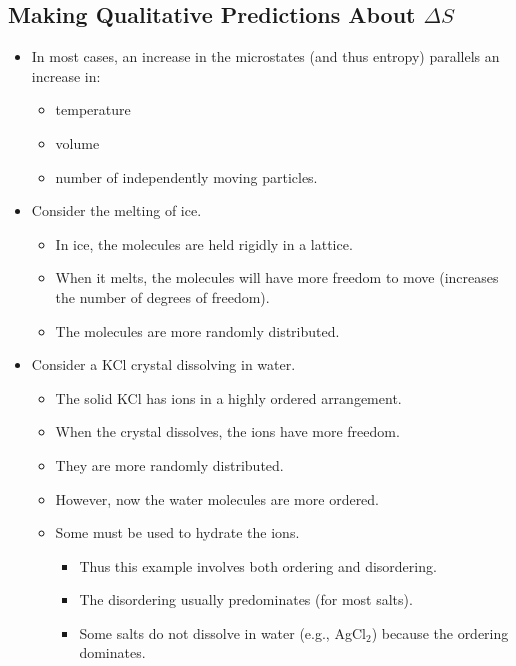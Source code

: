 \documentclass[10pt]{article}
\begin{document}
\subsection*{Making Qualitative Predictions About $\Delta S$}
\begin{itemize}
    \item In most cases, an increase in the microstates (and thus entropy) parallels an increase in:
    \begin{itemize}
        \item temperature
        \item volume
        \item number of independently moving particles.
    \end{itemize}
    \item Consider the melting of ice.
    \begin{itemize}
        \item In ice, the molecules are held rigidly in a lattice.
        \item When it melts, the molecules will have more freedom to move (increases the number of degrees of freedom).
        \item The molecules are more randomly distributed.
    \end{itemize}
    \item Consider a KCl crystal dissolving in water.
    \begin{itemize}
        \item The solid KCl has ions in a highly ordered arrangement.
        \item When the crystal dissolves, the ions have more freedom.
        \item They are more randomly distributed.
        \item However, now the water molecules are more ordered.
        \item Some must be used to hydrate the ions.
        \begin{itemize}
            \item Thus this example involves both ordering and disordering.
            \item The disordering usually predominates (for most salts).
            \item Some salts do not dissolve in water (e.g., AgCl$_2$) because the ordering dominates.
        \end{itemize}
    \end{itemize}

\end{itemize}
\end{document}
